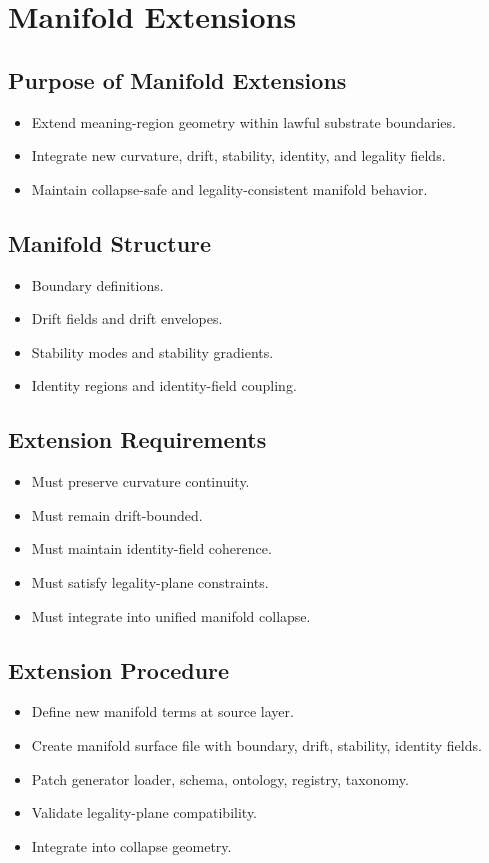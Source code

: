 \section{Manifold Extensions}

\subsection{Purpose of Manifold Extensions}
\begin{itemize}
    \item Extend meaning-region geometry within lawful substrate boundaries.
    \item Integrate new curvature, drift, stability, identity, and legality fields.
    \item Maintain collapse-safe and legality-consistent manifold behavior.
\end{itemize}

\subsection{Manifold Structure}
\begin{itemize}
    \item Boundary definitions.
    \item Drift fields and drift envelopes.
    \item Stability modes and stability gradients.
    \item Identity regions and identity-field coupling.
\end{itemize}

\subsection{Extension Requirements}
\begin{itemize}
    \item Must preserve curvature continuity.
    \item Must remain drift-bounded.
    \item Must maintain identity-field coherence.
    \item Must satisfy legality-plane constraints.
    \item Must integrate into unified manifold collapse.
\end{itemize}

\subsection{Extension Procedure}
\begin{itemize}
    \item Define new manifold terms at source layer.
    \item Create manifold surface file with boundary, drift, stability, identity fields.
    \item Patch generator loader, schema, ontology, registry, taxonomy.
    \item Validate legality-plane compatibility.
    \item Integrate into collapse geometry.
\end{itemize}

